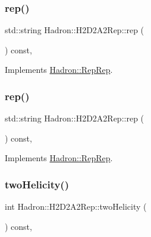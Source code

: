 \subsubsection{\texorpdfstring{rep()}{rep()}\hspace{0.1cm}{\footnotesize\ttfamily [2/3]}}
{\footnotesize\ttfamily std\+::string Hadron\+::\+H2\+D2\+A2\+Rep\+::rep (\begin{DoxyParamCaption}{ }\end{DoxyParamCaption}) const\hspace{0.3cm}{\ttfamily [inline]}, {\ttfamily [virtual]}}



Implements \mbox{\hyperlink{structHadron_1_1RepRep_ab3213025f6de249f7095892109575fde}{Hadron\+::\+Rep\+Rep}}.

\mbox{\label{structHadron_1_1H2D2A2Rep_a41083c39082d6fee296da79892e8b053}} 
\subsubsection{\texorpdfstring{rep()}{rep()}\hspace{0.1cm}{\footnotesize\ttfamily [3/3]}}
{\footnotesize\ttfamily std\+::string Hadron\+::\+H2\+D2\+A2\+Rep\+::rep (\begin{DoxyParamCaption}{ }\end{DoxyParamCaption}) const\hspace{0.3cm}{\ttfamily [inline]}, {\ttfamily [virtual]}}



Implements \mbox{\hyperlink{structHadron_1_1RepRep_ab3213025f6de249f7095892109575fde}{Hadron\+::\+Rep\+Rep}}.

\mbox{\label{structHadron_1_1H2D2A2Rep_a37671b4331422027fe047d7e50288c54}} 
\subsubsection{\texorpdfstring{twoHelicity()}{twoHelicity()}\hspace{0.1cm}{\footnotesize\ttfamily [1/2]}}
{\footnotesize\ttfamily int Hadron\+::\+H2\+D2\+A2\+Rep\+::two\+Helicity (\begin{DoxyParamCaption}{ }\end{DoxyParamCaption}) const\hspace{0.3cm}{\ttfamily [inline]}, {\ttfamily [virtual]}}

